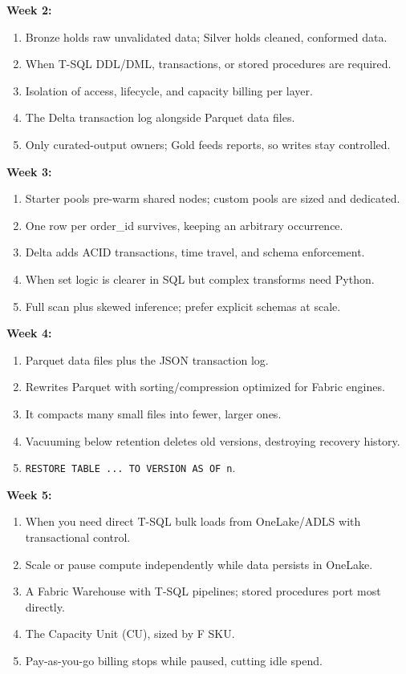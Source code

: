 \documentclass[11pt, a4paper]{article}
\begin{document}
\noindent\textbf{Week 2:}
\begin{enumerate}[leftmargin=8mm, itemsep=0pt]
    \item Bronze holds raw unvalidated data; Silver holds cleaned, conformed data.
    \item When T-SQL DDL/DML, transactions, or stored procedures are required.
    \item Isolation of access, lifecycle, and capacity billing per layer.
    \item The Delta transaction log alongside Parquet data files.
    \item Only curated-output owners; Gold feeds reports, so writes stay controlled.
\end{enumerate}

\noindent\textbf{Week 3:}
\begin{enumerate}[leftmargin=8mm, itemsep=0pt]
    \item Starter pools pre-warm shared nodes; custom pools are sized and dedicated.
    \item One row per order\_id survives, keeping an arbitrary occurrence.
    \item Delta adds ACID transactions, time travel, and schema enforcement.
    \item When set logic is clearer in SQL but complex transforms need Python.
    \item Full scan plus skewed inference; prefer explicit schemas at scale.
\end{enumerate}

\noindent\textbf{Week 4:}
\begin{enumerate}[leftmargin=8mm, itemsep=0pt]
    \item Parquet data files plus the JSON transaction log.
    \item Rewrites Parquet with sorting/compression optimized for Fabric engines.
    \item It compacts many small files into fewer, larger ones.
    \item Vacuuming below retention deletes old versions, destroying recovery history.
    \item \texttt{RESTORE TABLE ... TO VERSION AS OF n}.
\end{enumerate}

\noindent\textbf{Week 5:}
\begin{enumerate}[leftmargin=8mm, itemsep=0pt]
    \item When you need direct T-SQL bulk loads from OneLake/ADLS with transactional control.
    \item Scale or pause compute independently while data persists in OneLake.
    \item A Fabric Warehouse with T-SQL pipelines; stored procedures port most directly.
    \item The Capacity Unit (CU), sized by F SKU.
    \item Pay-as-you-go billing stops while paused, cutting idle spend.
\end{enumerate}
\end{document}
